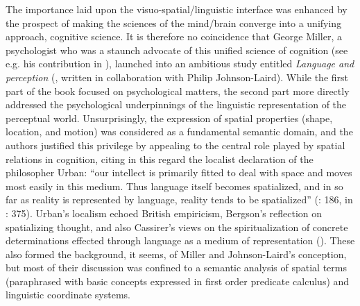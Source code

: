 \documentclass[output=paper]{langscibook}
\begin{document}
The importance laid upon the visuo-spatial\slash linguistic interface was enhanced by the prospect of making the sciences of the mind/brain converge into a unifying approach, cognitive science. It is therefore no coincidence that George Miller, a psychologist who was a staunch advocate of this unified science of cognition (see e.g. his contribution in \citealt{walker_report_1978}), launched into an ambitious study entitled \textit{Language and perception} (\citeyear{miller_language_1976}, written in collaboration with Philip Johnson-Laird). While the first part of the book focused on psychological matters, the second part more directly addressed the psychological underpinnings of the linguistic representation of the perceptual world. Unsurprisingly, the expression of spatial properties (shape, location, and motion) was considered as a fundamental semantic domain, and the authors justified this privilege by appealing to the central role played by spatial relations in cognition, citing in this regard the localist declaration of the philosopher Urban: “our intellect is primarily fitted to deal with space and moves most easily in this medium. Thus language itself becomes spatialized, and in so far as reality is represented by language, reality tends to be spatialized” (\citealt{urban_language_1939}: 186, in \citealt{miller_language_1976}: 375). Urban’s localism echoed British empiricism, Bergson’s reflection on spatializing thought, and also Cassirer’s views on the spiritualization of concrete determinations effected through language as a medium of representation (\citealt{cassirer_philosophie_1923}). These also formed the background, it seems, of Miller and Johnson-Laird’s conception, but most of their discussion was confined to a semantic analysis of spatial terms (paraphrased with basic concepts expressed in first order predicate calculus) and linguistic coordinate systems.
\end{document}
